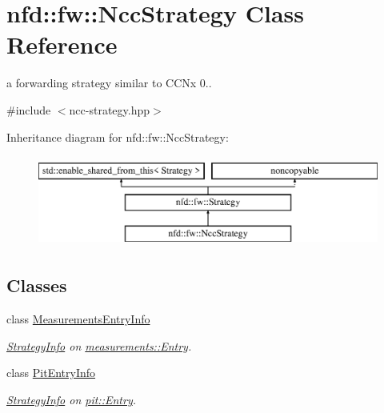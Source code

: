 \hypertarget{classnfd_1_1fw_1_1NccStrategy}{}\section{nfd\+:\+:fw\+:\+:Ncc\+Strategy Class Reference}
\label{classnfd_1_1fw_1_1NccStrategy}


a forwarding strategy similar to C\+C\+Nx 0..  




{\ttfamily \#include $<$ncc-\/strategy.\+hpp$>$}

Inheritance diagram for nfd\+:\+:fw\+:\+:Ncc\+Strategy\+:\begin{figure}[H]
\begin{center}
\leavevmode
\includegraphics[height=3.000000cm]{classnfd_1_1fw_1_1NccStrategy}
\end{center}
\end{figure}
\subsection*{Classes}
\begin{DoxyCompactItemize}
\item 
class \hyperlink{classnfd_1_1fw_1_1NccStrategy_1_1MeasurementsEntryInfo}{Measurements\+Entry\+Info}
\begin{DoxyCompactList}\small\item\em \hyperlink{classnfd_1_1fw_1_1StrategyInfo}{Strategy\+Info} on \hyperlink{classnfd_1_1measurements_1_1Entry}{measurements\+::\+Entry}. \end{DoxyCompactList}\item 
class \hyperlink{classnfd_1_1fw_1_1NccStrategy_1_1PitEntryInfo}{Pit\+Entry\+Info}
\begin{DoxyCompactList}\small\item\em \hyperlink{classnfd_1_1fw_1_1StrategyInfo}{Strategy\+Info} on \hyperlink{classnfd_1_1pit_1_1Entry}{pit\+::\+Entry}. \end{DoxyCompactList}\end{DoxyCompactItemize}

